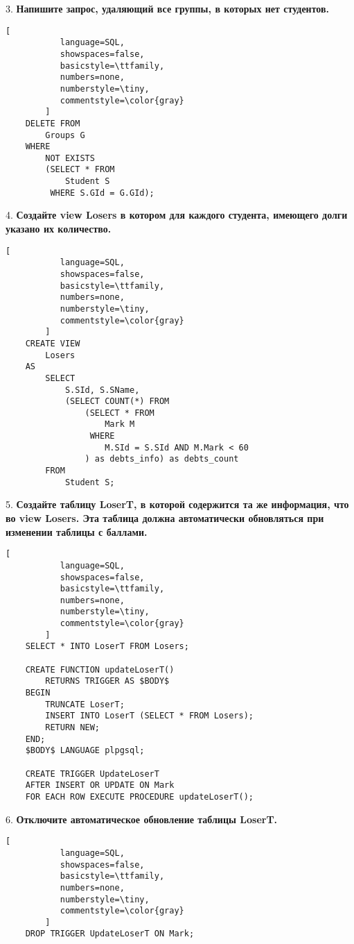 \documentclass[11pt,a4paper,oneside]{article}
\begin{document}
3. \textbf{Напишите запрос, удаляющий все группы, в которых нет студентов.}

\begin{lstlisting}[
           language=SQL,
           showspaces=false,
           basicstyle=\ttfamily,
           numbers=none,
           numberstyle=\tiny,
           commentstyle=\color{gray}
        ]
    DELETE FROM
        Groups G
    WHERE
        NOT EXISTS
        (SELECT * FROM
            Student S
         WHERE S.GId = G.GId);
\end{lstlisting}

4. \textbf{Создайте view Losers в котором для каждого студента, имеющего долги указано их количество.}
\begin{lstlisting}[
           language=SQL,
           showspaces=false,
           basicstyle=\ttfamily,
           numbers=none,
           numberstyle=\tiny,
           commentstyle=\color{gray}
        ]
    CREATE VIEW
        Losers
    AS
        SELECT
            S.SId, S.SName,
            (SELECT COUNT(*) FROM
                (SELECT * FROM
                    Mark M
                 WHERE 
                    M.SId = S.SId AND M.Mark < 60
                ) as debts_info) as debts_count
        FROM
            Student S;
\end{lstlisting}

5. \textbf{Создайте таблицу LoserT, в которой содержится та же информация, что во view Losers. Эта таблица должна автоматически обновляться при изменении таблицы с баллами.}
\begin{lstlisting}[
           language=SQL,
           showspaces=false,
           basicstyle=\ttfamily,
           numbers=none,
           numberstyle=\tiny,
           commentstyle=\color{gray}
        ]
    SELECT * INTO LoserT FROM Losers;

    CREATE FUNCTION updateLoserT()
        RETURNS TRIGGER AS $BODY$
    BEGIN
        TRUNCATE LoserT;
        INSERT INTO LoserT (SELECT * FROM Losers);
        RETURN NEW;
    END;
    $BODY$ LANGUAGE plpgsql;

    CREATE TRIGGER UpdateLoserT
    AFTER INSERT OR UPDATE ON Mark
    FOR EACH ROW EXECUTE PROCEDURE updateLoserT();
\end{lstlisting}

6. \textbf{Отключите автоматическое обновление таблицы LoserT.}
\begin{lstlisting}[
           language=SQL,
           showspaces=false,
           basicstyle=\ttfamily,
           numbers=none,
           numberstyle=\tiny,
           commentstyle=\color{gray}
        ]
    DROP TRIGGER UpdateLoserT ON Mark; 
\end{lstlisting}
\end{document}
